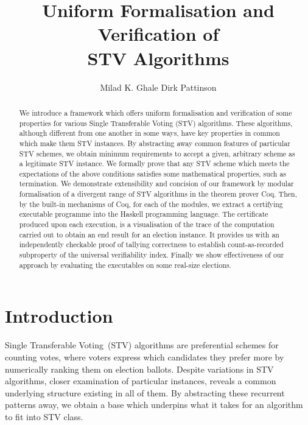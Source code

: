 \documentclass{llncs}
\title{Uniform Formalisation and Verification of \\STV Algorithms}
\author{Milad K. Ghale 
\hspace*{0.5cm} Dirk Pattinson}
\institute{Research School of Computer Science, ANU, Canberra}
\begin{document}
\maketitle
\pagestyle{plain}
\thispagestyle{empty}



\begin{abstract}
We introduce a framework which offers uniform formalisation and verification of some properties for various Single Transferable Voting (STV) algorithms.  These algorithms, although different from one another in some ways, have key properties in common which make them STV instances. By abstracting away common features of particular STV schemes, we obtain minimum requirements to accept a given, arbitrary scheme as a legitimate STV instance. We formally prove that any STV scheme which meets the  expectations of the above conditions satisfies some mathematical properties, such as termination. We demonstrate extensibility and concision of our framework by modular formalisation of a divergent range of STV algorithms in the theorem prover Coq. Then, by the built-in mechanisms of Coq, for each of the modules, we extract a certifying executable programme into the Haskell programming language. The certificate produced upon each execution, is a visualisation of the trace of the computation carried out to obtain an end result for an election instance. It provides us with an independently checkable proof of tallying correctness to establish count-as-recorded subproperty of the universal verifiability index. Finally we show effectiveness of our approach by evaluating the executables on some real-size elections. 
\end{abstract}

\section{Introduction}
Single Transferable Voting~(STV) algorithms are preferential schemes for counting votes, where voters express which candidates they prefer more by numerically ranking them on election ballots. Despite variations in STV algorithms,  closer examination of particular instances, reveals a common underlying structure existing in all of them. By abstracting these recurrent patterns away, we obtain a base which underpins what it takes for an algorithm to fit into STV class.     
\end{document}
